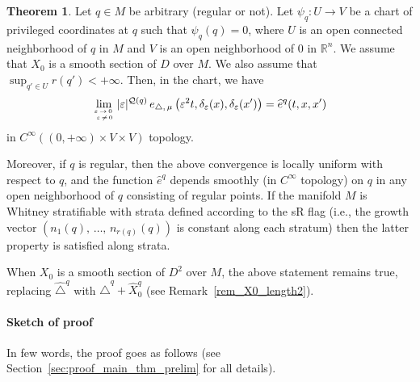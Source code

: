 \documentclass[10pt]{amsart}
\theoremstyle{definition}\newtheorem{defi}[theo]{Definition}\newtheorem{rema}[theo]{Remark}\newtheorem{exam}[theo]{Example}\newtheorem{exem}[theo]{Example}\newtheorem{nota}[theo]{Notation}
\newcommand*\R{\mathbb{R}}
\newcommand{\calQ}{\mathcal{Q}}
\newtheorem{theol}{Theorem}
\begin{document}
\begin{theol}\label{main_thm_weak}
Let $q\in M$ be arbitrary (regular or not). Let $\psi_{q}:U\rightarrow V$ be a chart of privileged coordinates at $q$ such that $\psi_{q}(q)=0$, where $U$ is an open connected neighborhood of $q$ in $M$ and $V$ is an open neighborhood of $0$ in $\R^n$. We assume that $X_0$ is a smooth section of $D$ over $M$. We also assume that $\sup_{q'\in U} r(q')<+\infty$. Then, in the chart, we have
\begin{equation}\label{limit_main_thm_weak}
\lim_{\varepsilon\,\rightarrow\,0\,\atop\,\varepsilon\,\neq\,0}
\vert\varepsilon\vert^{\calQ(q)}\, e_{\triangle,\,\mu}\left(\varepsilon^2 t,\delta_\varepsilon(x),\delta_\varepsilon(x')\right) = \widehat{e}^{q}(t,x,x')
\end{equation}
in $C^\infty((0,+\infty)\times V\times V)$ topology.

Moreover, if $q$ is regular, then the above convergence is locally uniform with respect to $q$, and the function $\widehat{e}^{q}$ depends smoothly (in $C^\infty$ topology) on $q$ in any open neighborhood of $q$ consisting of regular points. If the manifold $M$ is Whitney stratifiable with strata defined according to the sR flag (i.e., the growth vector $(n_1(q),\,\ldots,\,n_{r(q)}(q))$ is constant along each stratum) then the latter property is satisfied along strata.

When $X_0$ is a smooth section of $D^2$ over $M$, the above statement remains true, replacing $\widehat{\triangle}^{q}$ with $\widehat{\triangle}^{q}+\widehat{X}_0^{q}$ (see Remark~\ref{rem_X0_length2}).
\end{theol}

\goodbreak
\paragraph{Sketch of proof}
In few words, the proof goes as follows (see Section~\ref{sec:proof_main_thm_prelim} for all details).
\end{document}
